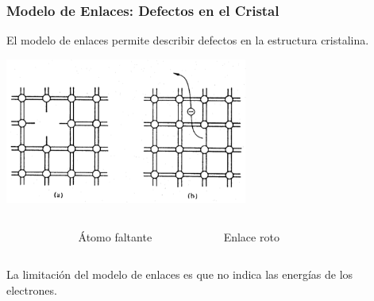 \documentclass[10pt,t,aspectratio=169]{beamer}
\begin{document}
\begin{frame}[t]
  \frametitle{Modelo de Enlaces: Defectos en el Cristal}

  El modelo de enlaces permite describir defectos en la estructura cristalina.

  \centering
  \includegraphics[width=0.6\textwidth]{./figures/modelo-defectos.png}

  \begin{columns}

    \begin{column}{0.20\textwidth}

    \end{column}
  
    \begin{column}{0.30\textwidth}
    
    \centering
    Átomo faltante
      
    \end{column}
    
    \begin{column}{0.30\textwidth}
    
      \centering
      Enlace roto
    \end{column}

    \begin{column}{0.20\textwidth}

    \end{column}
    
  \end{columns}

  \vspace{3mm}
  La limitación del modelo de enlaces es que no indica las energías de los electrones.
\end{frame}
\end{document}
